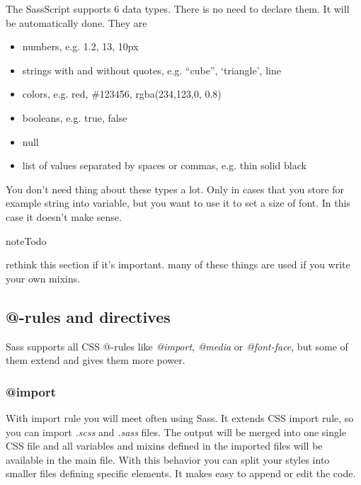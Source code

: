 \documentclass[a4paper,12pt,oneside]{sphinxmanual}
\begin{document}
The SassScript supports 6 data types. There is no need to declare them. It will be automatically done. They are
\begin{itemize}
\item {} 
numbers, e.g. 1.2, 13, 10px

\item {} 
strings with and without quotes, e.g. ``cube'', `triangle', line

\item {} 
colors, e.g. red, \#123456, rgba(234,123,0, 0.8)

\item {} 
booleans, e.g. true, false

\item {} 
null

\item {} 
list of values separated by spaces or commas, e.g. thin solid black

\end{itemize}

You don't need thing about these types a lot. Only in cases that you store for example string into variable, but you want to use it to set a size of font. In this case it doesn't make sense.

\begin{notice}{note}{Todo}

rethink this section if it's important. many of these things are used if you write your own mixins.
\end{notice}


\subsection{@-rules and directives}
\label{src/sass:rules-and-directives}
Sass supports all CSS @-rules like \emph{@import}, \emph{@media} or \emph{@font-face}, but some of them extend and gives them more power.


\subsubsection{@import}
\label{src/sass:import}
With import rule you will meet often using Sass. It extends CSS import rule, so you can import \emph{.scss} and \emph{.sass} files. The output will be merged into one single CSS file and all variables and mixins defined in the imported files will be available in the main file. With this behavior you can split your styles into smaller files defining specific elements. It makes easy to append or edit the code.
\end{document}
